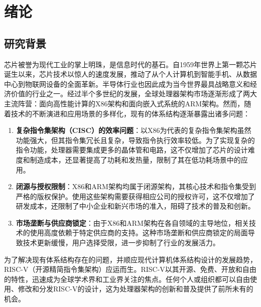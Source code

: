 
\clearpage
\setcounter{page}{1}

\chapter{绪论}

\section{研究背景}
芯片被誉为现代工业的掌上明珠，是信息时代的基石。自1959年世界上第一颗芯片诞生以来，芯片技术以惊人的速度发展，推动了从个人计算机到智能手机、从数据中心到物联网设备的全面革新。半导体行业也因此成为当今世界最具战略意义和经济价值的行业之一。经过半个多世纪的发展，全球处理器架构市场逐渐形成了两大主流阵营：面向高性能计算的X86架构和面向嵌入式系统的ARM架构。然而，随着技术的不断演进和应用场景的多样化，现有的体系结构逐渐暴露出诸多问题：

\begin{enumerate}[label={\arabic*)},itemsep=0pt, parsep=0pt]
	\item \textbf{复杂指令集架构（CISC）的效率问题}：以X86为代表的复杂指令集架构虽然功能强大，但其指令集冗长且复杂，导致指令执行效率较低。为了实现复杂的指令功能，处理器需要集成更多的晶体管和电路，这不仅增加了芯片的设计难度和制造成本，还显著提高了功耗和发热量，限制了其在低功耗场景中的应用。
	\item \textbf{闭源与授权限制}：X86和ARM架构均属于闭源架构，其核心技术和指令集受到严格的版权保护。使用这些架构需要获得相应公司的授权许可，这不仅增加了研发成本，还限制了中小企业和新兴市场的准入，阻碍了技术的普及和创新。
	\item \textbf{市场垄断与供应商锁定}：由于X86和ARM架构在各自领域的主导地位，相关技术的使用高度依赖于特定供应商的支持。这种市场垄断和供应商锁定的局面导致技术更新缓慢，用户选择受限，进一步抑制了行业的发展活力。
\end{enumerate}

为了解决现有体系结构存在的问题，并顺应现代计算机体系结构设计的发展趋势，RISC-V（开源精简指令集架构）应运而生。RISC-V以其开源、免费、开放和自由的特性，迅速成为全球学术界和工业界关注的焦点。任何个人或组织都可以自由使用、修改和分发RISC-V的设计，这为处理器架构的创新和普及提供了前所未有的机会。

